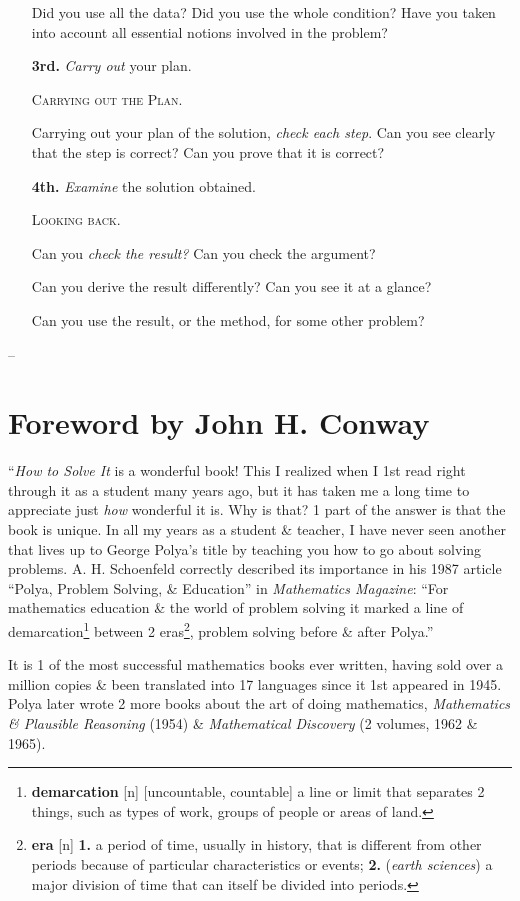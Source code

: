 \documentclass[oneside]{book}
\numberwithin{equation}{section}
\begin{document}
\begin{itemize}
	Did you use all the data? Did you use the whole condition? Have you taken into account all essential notions involved in the problem?
	\item[\textbf{3rd.}] \textit{Carry out} your plan.
	
	\textsc{Carrying out the Plan.}
	
	Carrying out your plan of the solution, \textit{check each step}. Can you see clearly that the step is correct? Can you prove that it is correct?
	\item[\textbf{4th.}] \textit{Examine} the solution obtained.
	
	\textsc{Looking back.}
	
	Can you \textit{check the result?} Can you check the argument?
	
	Can you derive the result differently? Can you see it at a glance?
	
	Can you use the result, or the method, for some other problem?
\end{itemize}
-- \cite[How to solve it, pp. xvi--xvii]{Polya2014}

\section*{Foreword by John H. Conway}
``\textit{How to Solve It} is a wonderful book! This I realized when I 1st read right through it as a student many years ago, but it has taken me a long time to appreciate just \textit{how} wonderful it is. Why is that? 1 part of the answer is that the book is unique. In all my years as a student \& teacher, I have never seen another that lives up to George Polya's title by teaching you how to go about solving problems. A. H. Schoenfeld correctly described its importance in his 1987 article ``Polya, Problem Solving, \& Education'' in \textit{Mathematics Magazine}: ``For mathematics education \& the world of problem solving it marked a line of demarcation\footnote{\textbf{demarcation} [n] [uncountable, countable] a line or limit that separates 2 things, such as types of work, groups of people or areas of land.} between 2 eras\footnote{\textbf{era} [n] \textbf{1.} a period of time, usually in history, that is different from other periods because of particular characteristics or events; \textbf{2.} (\textit{earth sciences}) a major division of time that can itself be divided into periods.}, problem solving before \& after Polya.''

It is 1 of the most successful mathematics books ever written, having sold over a million copies \& been translated into 17 languages since it 1st appeared in 1945. Polya later wrote 2 more books about the art of doing mathematics, \textit{Mathematics \& Plausible Reasoning} (1954) \& \textit{Mathematical Discovery} (2 volumes, 1962 \& 1965).
\end{document}

